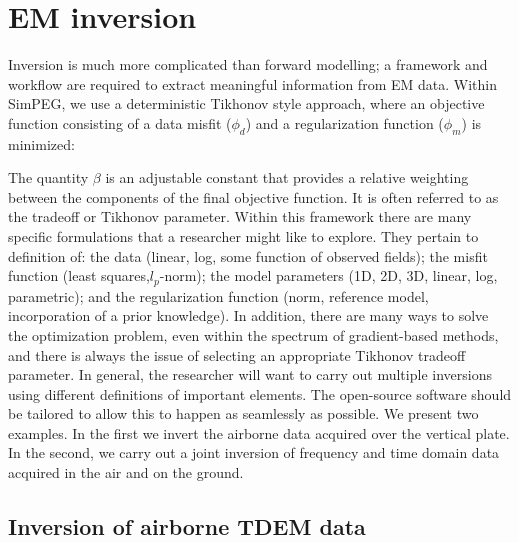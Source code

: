 \documentclass[paper]{geophysics}
\begin{document}




\section{EM inversion}

Inversion is much more complicated than forward modelling; a framework and  workflow are required to extract meaningful information from EM data. Within SimPEG, we use a deterministic Tikhonov style approach, where an objective function consisting of a data misfit ($\phi_d$) and a regularization function ($\phi_m$) is minimized:

The quantity $\beta$ is an adjustable constant that provides a relative weighting between the components of the final objective function. It is often referred to as the tradeoff or Tikhonov parameter. Within this framework there are many specific formulations that a researcher might like to explore. They pertain to definition of: the data (linear, log, some function of observed fields); the misfit function (least squares,$l_p$-norm); the model parameters (1D, 2D, 3D, linear, log, parametric); and the regularization function (norm, reference model, incorporation of a prior knowledge). In addition, there are many ways to solve the optimization problem, even within the spectrum of gradient-based methods, and there is always the issue of selecting an appropriate Tikhonov tradeoff parameter. In general, the researcher will want to carry out multiple inversions using different definitions of important elements. The open-source software should be tailored to allow this to happen as seamlessly as possible. We present two examples. In the first we invert the airborne data acquired over the vertical plate. In the second, we carry out a joint inversion of frequency and time domain data acquired in the air and on the ground.



\subsection{Inversion of airborne TDEM data}
\end{document}
